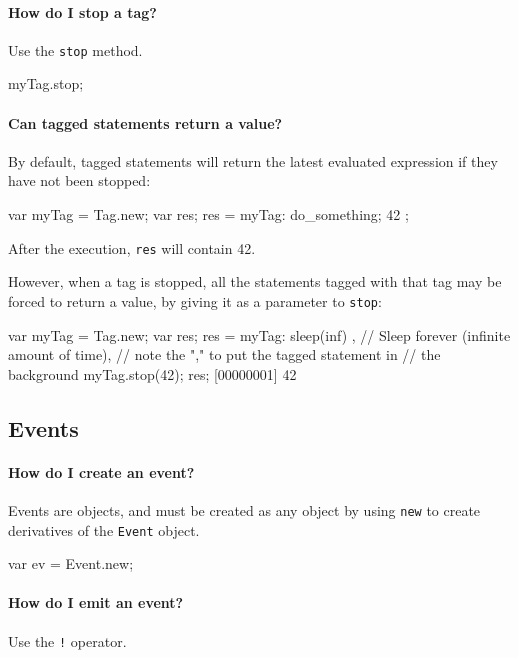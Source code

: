 \paragraph{How do I stop a tag?}

Use the \lstinline|stop| method.
\begin{urbifixme}
myTag.stop;
\end{urbifixme}

\paragraph{Can tagged statements return a value?}
By default, tagged statements will return the latest evaluated expression if
they have not been stopped:

\begin{urbifixme}
var myTag = Tag.new;
var res;
res = { myTag: { do_something; 42 } };
\end{urbifixme}

After the execution, \lstinline{res} will contain 42.

However, when a tag is stopped, all the statements tagged with that
tag may be forced to return a value, by giving it as a parameter to
\lstinline{stop}:

\begin{urbifixme}
var myTag = Tag.new;
var res;
{ res = { myTag: sleep(inf) } }, // Sleep forever (infinite amount of time),
                                 // note the "," to put the tagged statement in
                                 // the background
myTag.stop(42);
res;
[00000001] 42
\end{urbifixme}

\subsection{Events}
\paragraph{How do I create an event?}
Events are objects, and must be created as any object by using
\lstinline{new} to create derivatives of the \lstinline{Event} object.

\begin{urbifixme}
var ev = Event.new;
\end{urbifixme}

\paragraph{How do I emit an event?}
Use the \lstinline|!| operator.

